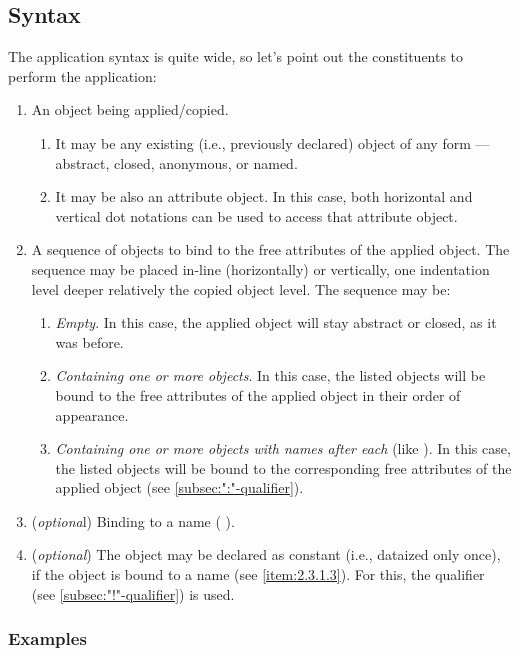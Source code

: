 \documentclass[12pt]{book}
\begin{document}
\subsection{Syntax}
The application syntax is quite wide, so let's point out the constituents to perform the application:

\begin{enumerate}
    \item An object being applied/copied.
    \begin{enumerate}
        \item It may be any existing (i.e., previously declared) object of any form — abstract, closed, anonymous, or named.
        \item It may be also an attribute object. In this case, both horizontal and vertical dot notations can be used to access that attribute object.
    \end{enumerate}
    \item A sequence of objects to bind to the free attributes of the applied object. The sequence may be placed in-line (horizontally) or vertically, one indentation level deeper relatively the copied object level. The sequence may be:
    \begin{enumerate}
        \item \textit{Empty}. In this case, the applied object will stay abstract or closed, as it was before.
        \item \textit{Containing one or more objects}. In this case, the listed objects will be bound to the free attributes of the applied object in their order of appearance.
        \item \textit{Containing one or more objects with names after each} (like   ). In this case, the listed objects will be bound to the corresponding free attributes of the applied object (see \ref{subsec:":"-qualifier}).
    \end{enumerate}
    \item \label{item:2.4.1.3} (\textit{optiona}l) Binding to a name ( ).
    \item (\textit{optional}) The object may be declared as constant (i.e., dataized only once), if the object is bound to a name (see \ref{item:2.3.1.3}). For this, the \ff{!} qualifier (see \ref{subsec:"!"-qualifier}) is used.
\end{enumerate}

\subsubsection{Examples}
\end{document}
